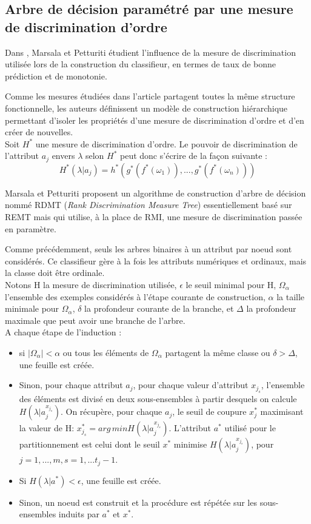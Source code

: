 \documentclass[a4paper]{article}
\begin{document}
\subsection{Arbre de décision paramétré par une mesure de discrimination
d'ordre} 
Dans \cite{marsala-rank}, Marsala et Petturiti étudient l'influence de
la mesure de discrimination utilisée lors de la construction du classifieur, en
termes de taux de bonne prédiction et de monotonie. 

Comme les mesures étudiées dans l'article partagent toutes la même structure
fonctionnelle, les auteurs définissent un modèle de construction hiérarchique
permettant d'isoler les propriétés d'une mesure de discrimination d'ordre et
d'en créer de nouvelles. \\
Soit $H^*$ une mesure de discrimination d'ordre. Le pouvoir de discrimination de
l'attribut $a_j$ envers $\lambda$ selon $H^*$ peut donc s'écrire de la façon suivante :
$$ H^*(\lambda | a_j) = h^*(g^*(f^*(\omega_1)),...,g^*(f^*(\omega_n)))$$

Marsala et Petturiti proposent un algorithme de construction d'arbre de décision
nommé RDMT (\textit{Rank Discrimination Measure Tree}) essentiellement basé sur
REMT mais qui utilise, à la place de RMI, une mesure de discrimination passée en paramètre.

\noindent Comme précédemment, seuls les arbres binaires à un attribut par noeud
sont considérés. Ce classifieur gère à la fois les attributs numériques et ordinaux, mais la classe
doit être ordinale. \\

Notons H la mesure de discrimination utilisée, $\epsilon$ le seuil minimal pour
H, $\Omega_{\alpha}$ l'ensemble des exemples considérés à l'étape courante de
construction, $\alpha$ la taille minimale pour $\Omega_{\alpha}$, $\delta$ la
profondeur courante de la branche, et $\Delta$ la profondeur maximale que peut
avoir une branche de l'arbre. \\

\noindent A chaque étape de l'induction :
\begin{itemize}
    \item si $|\Omega_{\alpha}| < \alpha$ ou tous les éléments
de $\Omega_{\alpha}$ partagent la même classe ou $\delta > \Delta$, une feuille est créée. 
    \item Sinon, pour chaque attribut $a_j$, pour chaque valeur d'attribut $x_{j_s}$, l'ensemble
des éléments est divisé en deux sous-ensembles à partir desquels on calcule
        $H(\lambda|a^{x_{j_s}}_j)$. On récupère, pour chaque $a_j$,
le seuil de coupure $x^*_j$ maximisant la valeur de H:
$x^*_{j_s} = arg\,min H(\lambda|a^{x_{j_s}}_j)$. L'attribut $a^*$ utilisé pour le
partitionnement est celui dont le seuil $x^*$ minimise
$H(\lambda|a^{x_{j_s}}_j)$, pour $j=1,...,m, s=1,...t_j-1.$ 
    \item Si $H(\lambda|a^*) < \epsilon$, une feuille est créée. 
    \item Sinon, un noeud est construit et la
procédure est répétée sur les sous-ensembles induits par $a^*$ et $x^*$. \\
\end{itemize}
\end{document}
